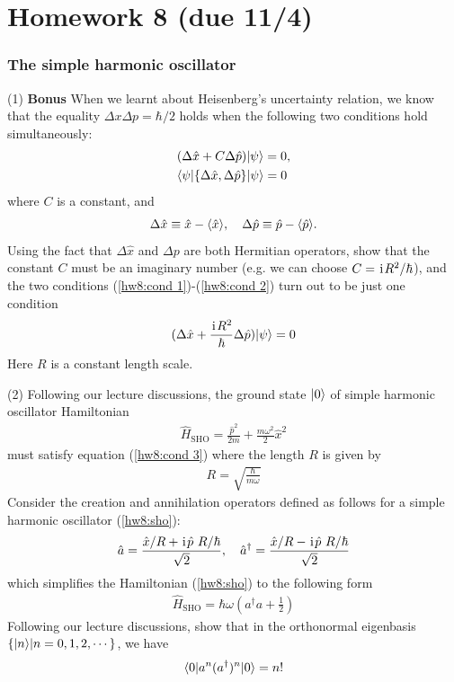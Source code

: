 \chapter{Homework 8 (due 11/4)}

\subsection{The simple harmonic oscillator}

(1) \textbf{Bonus} When we learnt about Heisenberg's uncertainty relation, we know that the equality $\Delta x\Delta p=\hbar/2$ holds when the following two conditions hold simultaneously:
\begin{align}\label{hw8:cond 1}
&(\Delta\hat x+C\Delta\hat p)|{\psi}\rangle=0,\\
&\langle{\psi|\{\Delta\hat x,\Delta\hat p\}|\psi}\rangle=0\label{hw8:cond 2}
\end{align}
where $C$ is a constant, and 
\begin{align}
\Delta\hat x\equiv\hat x-\langle{\hat x}\rangle,~~~\Delta\hat p\equiv\hat p-\langle{\hat p}\rangle.
\end{align}
Using the fact that $\Delta\hat x$ and $\Delta p$ are both Hermitian operators, show that the constant $C$ must be an imaginary number (e.g. we can choose $C=\hspace{1pt}\mathrm{i}\hspace{1pt} R^2/\hbar$), and the two conditions (\ref{hw8:cond 1})-(\ref{hw8:cond 2}) turn out to be just one condition
\begin{align}\label{hw8:cond 3}
(\Delta\hat x+\frac{\hspace{1pt}\mathrm{i}\hspace{1pt} R^2}{\hbar}\Delta\hat p)|{\psi}\rangle=0
\end{align}
Here $R$ is a constant length scale. 

(2) Following our lecture discussions, the ground state $|{0}\rangle$ of simple harmonic oscillator Hamiltonian
\begin{align}\label{hw8:sho}
\hat H_\text{SHO}=\frac{\hat p^2}{2m}+\frac{m\omega^2}2\hat x^2
\end{align}
must satisfy equation (\ref{hw8:cond 3}) where the length $R$ is given by
\begin{align}
R=\sqrt{\frac\hbar{m\omega}}
\end{align}
Consider the creation and annihilation operators defined as follows for a simple harmonic oscillator (\ref{hw8:sho}):
\begin{align}
\hat a=\frac{\hat x/R+\hspace{1pt}\mathrm{i}\hspace{1pt}\hat p~R/\hbar}{\sqrt2},~~~\hat a^\dagger=\frac{\hat x/R-\hspace{1pt}\mathrm{i}\hspace{1pt}\hat p~R/\hbar}{\sqrt2}
\end{align}
which simplifies the Hamiltonian (\ref{hw8:sho}) to the following form
\begin{align}
\hat H_\text{SHO}=\hbar\omega(a^\dagger a+\frac12)
\end{align}
Following our lecture discussions, show that in the orthonormal eigenbasis $\{|{n}\rangle|n=0,1,2,\cdots\}$, we have
\begin{align}
\langle{0|a^n(a^\dagger)^n|0}\rangle=n!
\end{align}

